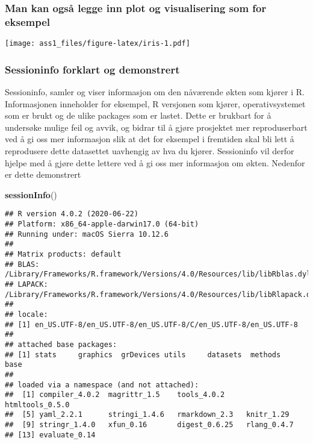 \documentclass[
  norsk,
]{article}
\newenvironment{Shaded}{\begin{snugshade}}{\end{snugshade}}
\newcommand{\KeywordTok}[1]{\textcolor[rgb]{0.13,0.29,0.53}{\textbf{#1}}}
\newcommand{\NormalTok}[1]{#1}
\begin{document}
\hypertarget{man-kan-ogsuxe5-legge-inn-plot-og-visualisering-som-for-eksempel}{%
\subsubsection{Man kan også legge inn plot og visualisering som for
eksempel}\label{man-kan-ogsuxe5-legge-inn-plot-og-visualisering-som-for-eksempel}}

\texttt{[image: ass1\_files/figure-latex/iris-1.pdf]}

\hypertarget{sessioninfo-forklart-og-demonstrert}{%
\subsubsection{\texorpdfstring{\textbf{Sessioninfo forklart og
demonstrert}}{Sessioninfo forklart og demonstrert}}\label{sessioninfo-forklart-og-demonstrert}}

Sessioninfo, samler og viser informasjon om den nåværende økten som
kjører i R. Informasjonen inneholder for eksempel, R versjonen som
kjører, operativsystemet som er brukt og de ulike packages som er
lastet. Dette er brukbart for å undersøke mulige feil og avvik, og
bidrar til å gjøre prosjektet mer reproduserbart ved å gi oss mer
informasjon slik at det for eksempel i fremtiden skal bli lett å
reprodusere dette datasettet uavhengig av hva du kjører. Sessioninfo vil
derfor hjelpe med å gjøre dette lettere ved å gi oss mer informasjon om
økten. Nedenfor er dette demonstrert

\begin{Shaded}
\begin{Highlighting}[]
\KeywordTok{sessionInfo}\NormalTok{()}
\end{Highlighting}
\end{Shaded}

\begin{verbatim}
## R version 4.0.2 (2020-06-22)
## Platform: x86_64-apple-darwin17.0 (64-bit)
## Running under: macOS Sierra 10.12.6
## 
## Matrix products: default
## BLAS:   /Library/Frameworks/R.framework/Versions/4.0/Resources/lib/libRblas.dylib
## LAPACK: /Library/Frameworks/R.framework/Versions/4.0/Resources/lib/libRlapack.dylib
## 
## locale:
## [1] en_US.UTF-8/en_US.UTF-8/en_US.UTF-8/C/en_US.UTF-8/en_US.UTF-8
## 
## attached base packages:
## [1] stats     graphics  grDevices utils     datasets  methods   base     
## 
## loaded via a namespace (and not attached):
##  [1] compiler_4.0.2  magrittr_1.5    tools_4.0.2     htmltools_0.5.0
##  [5] yaml_2.2.1      stringi_1.4.6   rmarkdown_2.3   knitr_1.29     
##  [9] stringr_1.4.0   xfun_0.16       digest_0.6.25   rlang_0.4.7    
## [13] evaluate_0.14
\end{verbatim}
\end{document}
